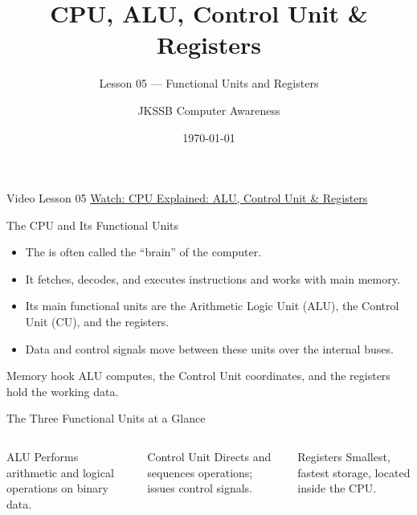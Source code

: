 \documentclass[aspectratio=169]{beamer}
\title{CPU, ALU, Control Unit \& Registers}
\subtitle{Lesson 05 --- Functional Units and Registers}
\author{JKSSB Computer Awareness}
\date{\today}
\begin{document}
\frame{\titlepage}

\begin{frame}{Video Lesson 05}
  \centering
  \Large\href{https://youtu.be/b6w8uT4GBYQ}{Watch: CPU Explained: ALU, Control Unit \& Registers}
\end{frame}

\begin{frame}{The CPU and Its Functional Units}
  \begin{itemize}
    \item The  is often called the
      ``brain'' of the computer.
    \item It fetches, decodes, and executes instructions and works with main
      memory.
    \item Its main functional units are the Arithmetic Logic Unit (ALU),
      the Control Unit (CU), and the registers.
    \item Data and control signals move between these units over the
      internal buses.
  \end{itemize}
  \begin{block}{Memory hook}
    ALU computes, the Control Unit coordinates, and the registers hold the
    working data.
  \end{block}
\end{frame}

\begin{frame}{The Three Functional Units at a Glance}
  \begin{columns}[T]
      \begin{block}{ALU}
        Performs arithmetic and logical operations on binary data.
      \end{block}
      \begin{block}{Control Unit}
        Directs and sequences operations; issues control signals.
      \end{block}
      \begin{block}{Registers}
        Smallest, fastest storage, located inside the CPU.
      \end{block}
  \end{columns}
  \vspace{0.4cm}
\end{frame}
\end{document}
